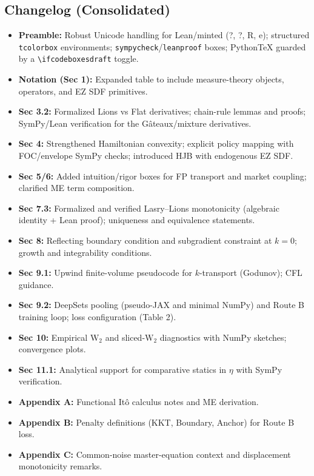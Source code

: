 ﻿\documentclass[11pt,letterpaper,oneside]{article}
\numberwithin{equation}{section}
\newcommand{\1}{\mathbf{1}}
\begin{document}
\begin{tcolorbox}[didacticstyle]
\begin{itemize}[leftmargin=1.1em,itemsep=0.25em]
\subsection*{Changelog (Consolidated)}
\begin{itemize}[leftmargin=1.15em,itemsep=0.25em]
  \item \textbf{Preamble:} Robust Unicode handling for Lean/minted (?, ?, R, e); structured \texttt{tcolorbox} environments; \texttt{sympycheck}/\texttt{leanproof} boxes; PythonTeX guarded by a \texttt{\textbackslash ifcodeboxesdraft} toggle.
  \item \textbf{Notation (Sec 1):} Expanded table to include measure-theory objects, operators, and EZ SDF primitives.
  \item \textbf{Sec 3.2:} Formalized Lions vs Flat derivatives; chain-rule lemmas and proofs; SymPy/Lean verification for the Gâteaux/mixture derivatives.
  \item \textbf{Sec 4:} Strengthened Hamiltonian convexity; explicit policy mapping with FOC/envelope SymPy checks; introduced HJB with endogenous EZ SDF.
  \item \textbf{Sec 5/6:} Added intuition/rigor boxes for FP transport and market coupling; clarified ME term composition.
  \item \textbf{Sec 7.3:} Formalized and verified Lasry–Lions monotonicity (algebraic identity + Lean proof); uniqueness and equivalence statements.
  \item \textbf{Sec 8:} Reflecting boundary condition and subgradient constraint at $k=0$; growth and integrability conditions.
  \item \textbf{Sec 9.1:} Upwind finite-volume pseudocode for $k$-transport (Godunov); CFL guidance.
  \item \textbf{Sec 9.2:} DeepSets pooling (pseudo-JAX and minimal NumPy) and Route B training loop; loss configuration (Table 2).
  \item \textbf{Sec 10:} Empirical $\mathrm W_2$ and sliced-$\mathrm W_2$ diagnostics with NumPy sketches; convergence plots.
  \item \textbf{Sec 11.1:} Analytical support for comparative statics in $\eta$ with SymPy verification.
  \item \textbf{Appendix A:} Functional Itô calculus notes and ME derivation.
  \item \textbf{Appendix B:} Penalty definitions (KKT, Boundary, Anchor) for Route B loss.
  \item \textbf{Appendix C:} Common-noise master-equation context and displacement monotonicity remarks.

\end{itemize}
\end{itemize}
\end{tcolorbox}
\end{document}
